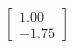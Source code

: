 \documentclass[preview]{standalone}
\begin{document}
\begin{align*}
\begin{bmatrix} 1.00 \\ -1.75 \end{bmatrix}
\end{align*}
\end{document}
